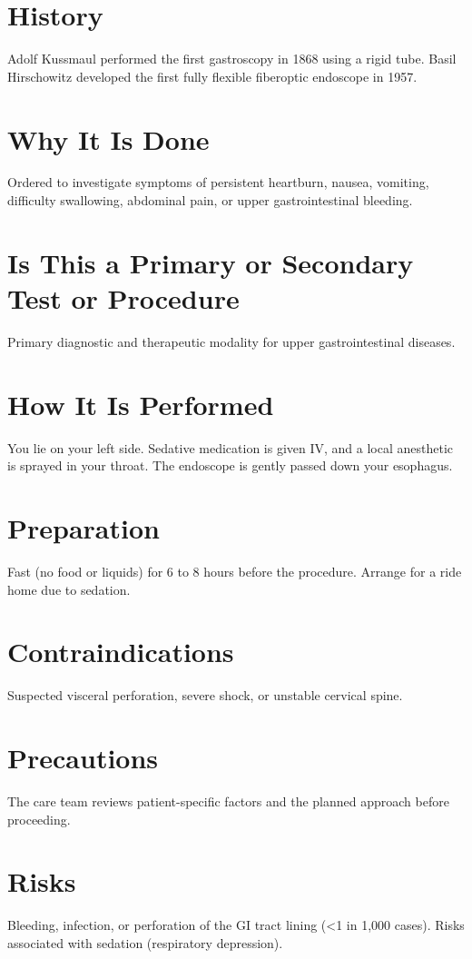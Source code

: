 \section*{History}
Adolf Kussmaul performed the first gastroscopy in 1868 using a rigid tube. Basil Hirschowitz developed the first fully flexible fiberoptic endoscope in 1957.

\section*{Why It Is Done}
Ordered to investigate symptoms of persistent heartburn, nausea, vomiting, difficulty swallowing, abdominal pain, or upper gastrointestinal bleeding.

\section*{Is This a Primary or Secondary Test or Procedure}
Primary diagnostic and therapeutic modality for upper gastrointestinal diseases.

\section*{How It Is Performed}
You lie on your left side. Sedative medication is given IV, and a local anesthetic is sprayed in your throat. The endoscope is gently passed down your esophagus.

\section*{Preparation}
Fast (no food or liquids) for 6 to 8 hours before the procedure. Arrange for a ride home due to sedation.

\section*{Contraindications}
Suspected visceral perforation, severe shock, or unstable cervical spine.

\section*{Precautions}
The care team reviews patient-specific factors and the planned approach before proceeding.

\section*{Risks}
Bleeding, infection, or perforation of the GI tract lining (<1 in 1,000 cases). Risks associated with sedation (respiratory depression).

